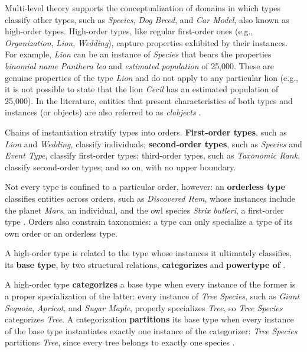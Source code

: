 Multi-level theory supports the conceptualization of domains in which types classify other types, such as \emph{Species}, \emph{Dog Breed}, and \emph{Car Model}, also known as high-order types. High-order types, like regular first-order ones (e.g., \emph{Organization}, \emph{Lion}, \emph{Wedding}), capture properties exhibited by their instances. For example, \emph{Lion} can be an instance of \emph{Species} that bears the properties \emph{binomial name} \emph{Panthera leo} and \emph{estimated population} of 25,000. These are genuine properties of the type \emph{Lion} and do not apply to any particular lion (e.g., it is not possible to state that the lion \emph{Cecil} has an estimated population of 25,000). In the literature, entities that present characteristics of both types and instances (or objects) are also referred to as \emph{clabjects} \cite{incorporating_types_of_types_in_ontology_driven_conceptual_modeling_2022}.

Chains of instantiation stratify types into orders. \textbf{First-order types}, such as \emph{Lion} and \emph{Wedding}, classify individuals; \textbf{second-order types}, such as \emph{Species} and \emph{Event Type}, classify first-order types; third-order types, such as \emph{Taxonomic Rank}, classify second-order types; and so on, with no upper boundary.

Not every type is confined to a particular order, however: an \textbf{orderless type} classifies entities across orders, such as \emph{Discovered Item}, whose instances include the planet \emph{Mars}, an individual, and the owl species \emph{Strix butleri}, a first-order type \cite{incorporating_types_of_types_in_ontology_driven_conceptual_modeling_2022}. Orders also constrain taxonomies: a type can only specialize a type of its own order or an orderless type.

A high-order type is related to the type whose instances it ultimately classifies, its \textbf{base type}, by two structural relations, \textbf{categorizes} and \textbf{powertype of} \cite{incorporating_types_of_types_in_ontology_driven_conceptual_modeling_2022}.

A high-order type \textbf{categorizes} a base type when every instance of the former is a proper specialization of the latter: every instance of \emph{Tree Species}, such as \emph{Giant Sequoia}, \emph{Apricot}, and \emph{Sugar Maple}, properly specializes \emph{Tree}, so \emph{Tree Species} categorizes \emph{Tree}. A categorization \textbf{partitions} its base type when every instance of the base type instantiates exactly one instance of the categorizer: \emph{Tree Species} partitions \emph{Tree}, since every tree belongs to exactly one species \cite{carvalho2018mlt}.

